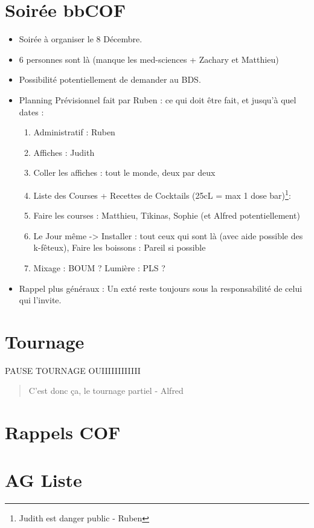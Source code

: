 \documentclass{article}
\begin{document}
\section{Soirée bbCOF}
\begin{itemize}
    \item Soirée à organiser le 8 Décembre.
    \item 6 personnes sont là (manque les med-sciences + Zachary et Matthieu)
    \item Possibilité potentiellement de demander au BDS. 
    \item Planning Prévisionnel fait par Ruben : ce qui doit être fait, et jusqu'à quel dates : 
    \begin{enumerate}
        \item Administratif : Ruben
        \item Affiches : Judith 
        \item Coller les affiches : tout le monde, deux par deux
        \item Liste des Courses + Recettes de Cocktails (25cL = max 1 dose bar)\footnote{Judith est danger public - Ruben}: 
        \item Faire les courses : Matthieu, Tikinas, Sophie (et Alfred potentiellement) 
        \item Le Jour même -> Installer : tout ceux qui sont là (avec aide possible des k-fêteux), Faire les boissons : Pareil si possible
        \item Mixage : BOUM ? Lumière : PLS ? 
    \end{enumerate}
    \item Rappel plus généraux : Un exté reste toujours sous la responsabilité de celui qui l'invite. 
\end{itemize}

\section{Tournage}
PAUSE TOURNAGE OUIIIIIIIIIIII
\begin{quotation}
    C'est donc ça, le tournage partiel - Alfred
\end{quotation}

\section{Rappels COF}

\section{AG Liste}
\end{document}
